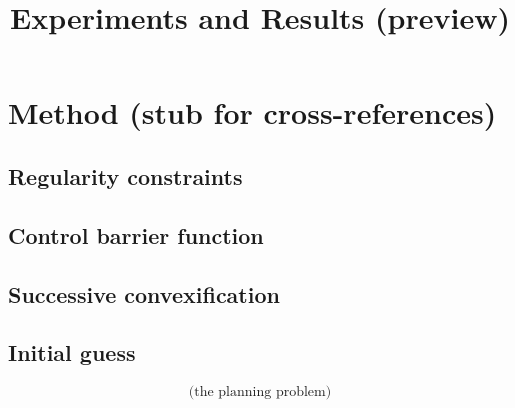 \documentclass[10pt]{article}
\title{Experiments and Results (preview)}
\date{}
\begin{document}
\maketitle

\section{Method (stub for cross-references)}
\subsection{Regularity constraints}\label{sec:regularity}
\subsection{Control barrier function}\label{sec:cbf}
\subsection{Successive convexification}\label{sec:scp}
\subsection{Initial guess}\label{sec:init}
\begin{equation}\label{eq:ocp}
  \text{(the planning problem)}
\end{equation}



\appendix




\end{document}
